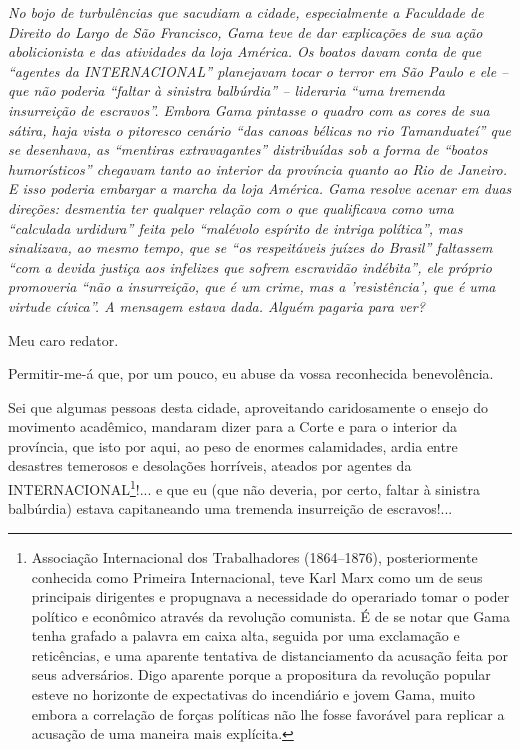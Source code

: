 {\begin{didascalia}
\emph{No bojo de turbulências que sacudiam a cidade, especialmente a
Faculdade de Direito do Largo de São Francisco, Gama teve de dar
explicações de sua ação abolicionista e das atividades da loja América.
Os boatos davam conta de que ``agentes da INTERNACIONAL'' planejavam tocar
o terror em São Paulo e ele -- que não poderia ``faltar à sinistra
balbúrdia'' -- lideraria ``uma tremenda insurreição de escravos''. Embora
Gama pintasse o quadro com as cores de sua sátira, haja vista o
pitoresco cenário ``das canoas bélicas no rio Tamanduateí'' que se
desenhava, as ``mentiras extravagantes'' distribuídas sob a forma de
``boatos humorísticos'' chegavam tanto ao interior da província quanto ao
Rio de Janeiro. E isso poderia embargar a marcha da loja América. Gama
resolve acenar em duas direções: desmentia ter qualquer relação com o
que qualificava como uma ``calculada urdidura'' feita pelo ``malévolo
espírito de intriga política'', mas sinalizava, ao mesmo tempo, que se
``os respeitáveis juízes do Brasil'' faltassem ``com a devida justiça aos
infelizes que sofrem escravidão indébita'', ele próprio promoveria ``não a
insurreição, que é um crime, mas a 'resistência', que é uma virtude
cívica''. A mensagem estava dada. Alguém pagaria para ver?}
\end{didascalia}

\asterisc{}

Meu caro redator.

Permitir-me-á que, por um pouco, eu abuse da vossa reconhecida
benevolência.

Sei que algumas pessoas desta cidade, aproveitando caridosamente o
ensejo do movimento acadêmico, mandaram dizer para a Corte e para o
interior da província, que isto por aqui, ao peso de enormes
calamidades, ardia entre desastres temerosos e desolações horríveis,
ateados por agentes da INTERNACIONAL\footnote{ Associação Internacional
  dos Trabalhadores (1864--1876), posteriormente conhecida como Primeira
  Internacional, teve Karl Marx como um de seus principais dirigentes e
  propugnava a necessidade do operariado tomar o poder político e
  econômico através da revolução comunista. É de se notar que Gama tenha
  grafado a palavra em caixa alta, seguida por uma exclamação e
  reticências, e uma aparente tentativa de distanciamento da acusação
  feita por seus adversários. Digo aparente porque a propositura da
  revolução popular esteve no horizonte de expectativas do incendiário e
  jovem Gama, muito embora a correlação de forças políticas não lhe
  fosse favorável para replicar a acusação de uma maneira mais
  explícita.}!... e que eu (que não deveria, por certo, faltar à
sinistra balbúrdia) estava capitaneando uma tremenda insurreição de
escravos!...

}
